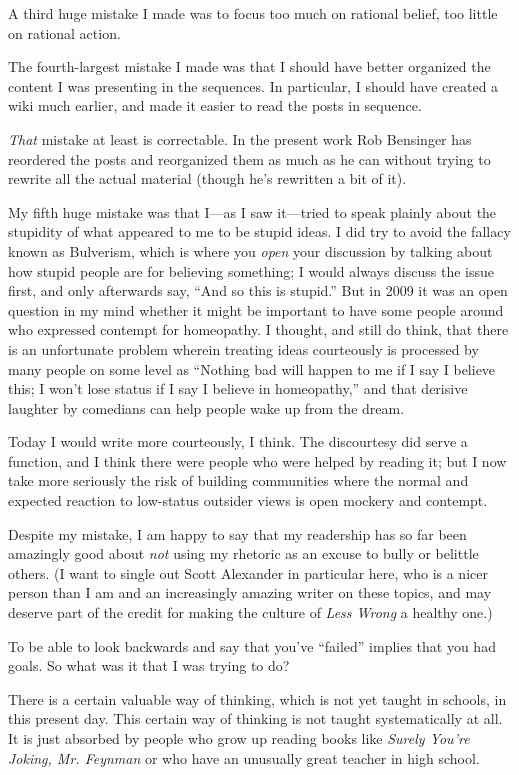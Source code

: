 \documentclass[letterpaper]{book}
\begin{document}
{
 A third huge mistake I made was to focus too much on rational
belief, too little on rational action.}

{
 The fourth-largest mistake I made was that I should have better
organized the content I was presenting in the sequences. In particular,
I should have created a wiki much earlier, and made it easier to read
the posts in sequence.}

{
 \textit{That} mistake at least is correctable. In the present work
Rob Bensinger has reordered the posts and reorganized them as much as
he can without trying to rewrite all the actual material (though
he's rewritten a bit of it).}

{
 My fifth huge mistake was that I---as I saw it---tried to speak
plainly about the stupidity of what appeared to me to be stupid ideas.
I did try to avoid the fallacy known as Bulverism, which is where you
\textit{open} your discussion by talking about how stupid people are
for believing something; I would always discuss the issue first, and
only afterwards say, ``And so this is
stupid.'' But in 2009 it was an open question in my
mind whether it might be important to have some people around who
expressed contempt for homeopathy. I thought, and still do think, that
there is an unfortunate problem wherein treating ideas courteously is
processed by many people on some level as ``Nothing
bad will happen to me if I say I believe this; I won't
lose status if I say I believe in homeopathy,'' and
that derisive laughter by comedians can help people wake up from the
dream.}

{
 Today I would write more courteously, I think. The discourtesy did
serve a function, and I think there were people who were helped by
reading it; but I now take more seriously the risk of building
communities where the normal and expected reaction to low-status
outsider views is open mockery and contempt.}

{
 Despite my mistake, I am happy to say that my readership has so
far been amazingly good about \textit{not} using my rhetoric as an
excuse to bully or belittle others. (I want to single out Scott
Alexander in particular here, who is a nicer person than I am and an
increasingly amazing writer on these topics, and may deserve part of
the credit for making the culture of \textit{Less Wrong} a healthy
one.)}

{
 To be able to look backwards and say that you've
``failed'' implies that you had
goals. So what was it that I was trying to do?}

{
 There is a certain valuable way of thinking, which is not yet
taught in schools, in this present day. This certain way of thinking is
not taught systematically at all. It is just absorbed by people who
grow up reading books like \textit{Surely You're
Joking, Mr. Feynman} or who have an unusually great teacher in high
school.}
\end{document}
